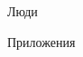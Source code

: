 \documentclass[12pt, a4paper]{article}
\begin{document}
    \begin{multicols}{2}[]
        \begin{figure}[H]
            \caption{Люди}
        \end{figure}
        \columnbreak
        \begin{figure}[H]
            \caption{Приложения}
        \end{figure}
    \end{multicols}
\end{document}
